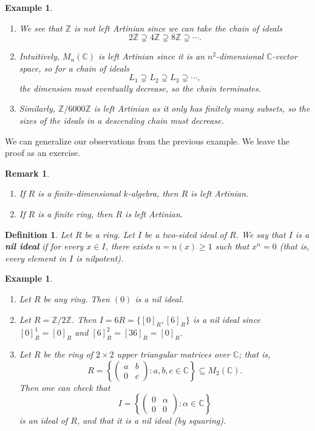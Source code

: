 \documentclass[10pt]{article}
\numberwithin{equation}{section}
\newcommand{\C}{\mathbb{C}}
\newcommand{\Z}{\mathbb{Z}}
\theoremstyle{newstyle}
\newtheorem{remark}[thm]{Remark}
\newtheorem{defn}[thm]{Definition}
\newtheorem{exmp}[thm]{Example}
\begin{document}
\begin{exmp}~
\begin{enumerate}[(1)]
    \item We see that $\Z$ is not left Artinian since we can take the chain of ideals 
    \[ 2\Z \supsetneq 4\Z \supsetneq 8\Z \supsetneq \cdots. \]
    \item Intuitively, $M_n(\C)$ is left Artinian since it is an $n^2$-dimensional $\C$-vector space, so
    for a chain of ideals
    \[ L_1 \supsetneq L_2 \supsetneq L_3 \supsetneq \cdots, \]
    the dimension must eventually decrease, so the chain terminates.
    \item Similarly, $\Z/6000\Z$ is left Artinian as it only has finitely many subsets, so the 
    sizes of the ideals in a descending chain must decrease. 
\end{enumerate}
\end{exmp}

We can generalize our observations from the previous example. We leave the proof as an exercise.

\begin{remark}~
\begin{enumerate}[(1)]
    \item If $R$ is a finite-dimensional $k$-algebra, then $R$ is left Artinian.
    \item If $R$ is a finite ring, then $R$ is left Artinian.
\end{enumerate}
\end{remark}

\begin{defn}
Let $R$ be a ring. Let $I$ be a two-sided ideal of $R$. We say that $I$ is a {\bf nil ideal} 
if for every $x \in I$,  there exists $n = n(x) \geq 1$ such that $x^n = 0$ (that is, 
every element in $I$ is nilpotent). 
\end{defn}

\begin{exmp}~
\begin{enumerate}[(1)]
    \item Let $R$ be any ring. Then $(0)$ is a nil ideal. 
    \item Let $R = \Z/2\Z$. Then $I = 6R = \{[0]_R, [6]_R\}$ is a nil ideal since 
    $[0]_R^1 = [0]_R$ and $[6]_R^2 = [36]_R = [0]_R$. 
    \item Let $R$ be the ring of $2 \times 2$ upper triangular matrices over $\C$; that is, 
    \[ R = \left\{ \begin{pmatrix} a&b\\0&c \end{pmatrix} : a, b,c \in \C \right\} \subseteq M_2(\C). \]
    Then one can check that 
    \[ I = \left\{ \begin{pmatrix} 0&\alpha\\0&0 \end{pmatrix} : \alpha \in \C \right\} \]
    is an ideal of $R$, and that it is a nil ideal (by squaring). 
\end{enumerate}
\end{exmp}
\end{document}
